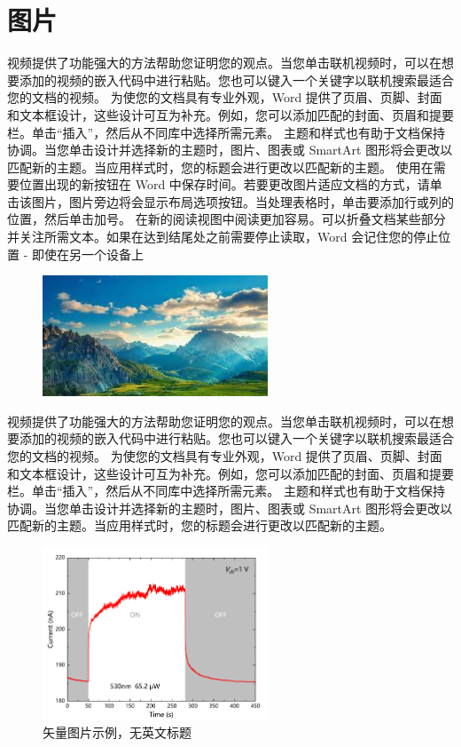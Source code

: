 \section{图片}
视频提供了功能强大的方法帮助您证明您的观点。当您单击联机视频时，可以在想要添加的视频的嵌入代码中进行粘贴。您也可以键入一个关键字以联机搜索最适合您的文档的视频。
为使您的文档具有专业外观，Word 提供了页眉、页脚、封面和文本框设计，这些设计可互为补充。例如，您可以添加匹配的封面、页眉和提要栏。单击“插入”，然后从不同库中选择所需元素。
主题和样式也有助于文档保持协调。当您单击设计并选择新的主题时，图片、图表或 SmartArt 图形将会更改以匹配新的主题。当应用样式时，您的标题会进行更改以匹配新的主题。
使用在需要位置出现的新按钮在 Word 中保存时间。若要更改图片适应文档的方式，请单击该图片，图片旁边将会显示布局选项按钮。当处理表格时，单击要添加行或列的位置，然后单击加号。
在新的阅读视图中阅读更加容易。可以折叠文档某些部分并关注所需文本。如果在达到结尾处之前需要停止读取，Word 会记住您的停止位置 - 即使在另一个设备上
\begin{figure}[H]
	\centering
	\includegraphics[width=0.6\textwidth]{figure/chapter1/Omni.jpg}
	\label{picexam}
\end{figure}
视频提供了功能强大的方法帮助您证明您的观点。当您单击联机视频时，可以在想要添加的视频的嵌入代码中进行粘贴。您也可以键入一个关键字以联机搜索最适合您的文档的视频。
为使您的文档具有专业外观，Word 提供了页眉、页脚、封面和文本框设计，这些设计可互为补充。例如，您可以添加匹配的封面、页眉和提要栏。单击“插入”，然后从不同库中选择所需元素。
主题和样式也有助于文档保持协调。当您单击设计并选择新的主题时，图片、图表或 SmartArt 图形将会更改以匹配新的主题。当应用样式时，您的标题会进行更改以匹配新的主题。
\begin{figure}[H]
	\centering
	\includegraphics[width=0.6\textwidth]{figure/chapter1/Graph3.pdf}
	\caption{矢量图片示例，无英文标题}	
	\label{pdfpic}
\end{figure}
